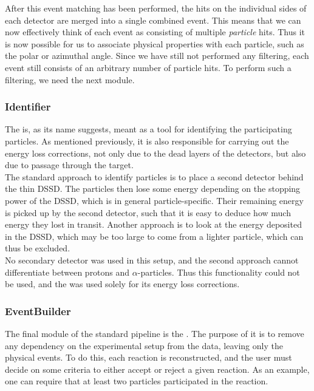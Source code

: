 After this event matching has been performed, the hits on the individual sides of each detector are merged into a single combined event. This means that we can now effectively think of each event as consisting of multiple \textit{particle} hits. Thus it is now possible for us to associate physical properties with each particle, such as the polar or azimuthal angle. Since we have still not performed any filtering, each event still consists of an arbitrary number of particle hits. To perform such a filtering, we need the next module. 

\subsubsection{Identifier}
The \Identifier{} is, as its name suggests, meant as a tool for identifying the participating particles. As mentioned previously, it is also responsible for carrying out the energy loss corrections, not only due to the dead layers of the detectors, but also due to passage through the target. \\

The standard approach to identify particles is to place a second detector behind the thin DSSD. The particles then lose some energy depending on the stopping power of the DSSD, which is in general particle-specific. Their remaining energy is picked up by the second detector, such that it is easy to deduce how much energy they lost in transit. Another approach is to look at the energy deposited in the DSSD, which may be too large to come from a lighter particle, which can thus be excluded. \\

No secondary detector was used in this setup, and the second approach cannot differentiate between protons and $\alpha$-particles. Thus this functionality could not be used, and the \Identifier{} was used solely for its energy loss corrections.  

\subsubsection{EventBuilder}
The final module of the standard \AUSAlib{} pipeline is the \EventBuilder{}. The purpose of it is to remove any dependency on the experimental setup from the data, leaving only the physical events. To do this, each reaction is reconstructed, and the user must decide on some criteria to either accept or reject a given reaction. As an example, one can require that at least two particles participated in the reaction. \\

